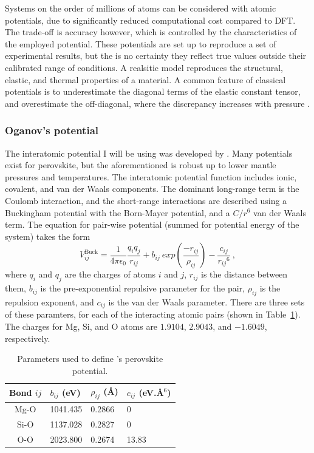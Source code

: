 Systems on the order of millions of atoms can be considered with atomic potentials, due to significantly reduced computational cost compared to DFT. The trade-off is accuracy however, which is controlled by the characteristics of the employed potential. These potentials are set up to reproduce a set of experimental results, but the is no certainty they reflect true values outside their calibrated range of conditions. A realsitic model reproduces the structural, elastic, and thermal properties of a material. A common feature of classical potentials is to underestimate the diagonal terms of the elastic constant tensor, and overestimate the off-diagonal, where the discrepancy increases with pressure \citep{Chen2012}.

\subsubsection{Oganov's \bdgs potential}

The interatomic potential I will be using  was developed by \citet{Oganov2000}. Many potentials exist for \mgsios perovskite, but the aforementioned is robust up to lower mantle pressures and temperatures. The interatomic potential function includes ionic, covalent, and van der Waals components. The dominant long-range term is the Coulomb interaction, and the short-range interactions are described using a Buckingham potential with the Born-Mayer potential, and a $C/r^{6}$ van der Waals term. The equation for pair-wise potential (summed for potential energy of the system) takes the form
%
\begin{equation}
V_{ij}^{\mathrm{Buck}}
= \frac{1}{4 \pi \epsilon_{0}} 
\frac{q_{i} q_{j}}{r_{ij}} 
+ b_{ij}\ exp\left ( \frac{-r_{ij}}{\rho_{ij}} \right )
- \frac{c_{ij}}{{r_{ij}}^{6}} \  ,
\label{eq.buck}
\end{equation}
%
where $q_{i}$ and $q_{j}$ are the charges of atoms $i$ and $j$, $r_{ij}$ is the distance between them, $b_{ij}$ is the pre-exponential repulsive parameter for the pair, $\rho_{ij}$ is the repulsion exponent, and $c_{ij}$ is the van der Waals parameter.
There are three sets of these paramters, for each of the interacting atomic pairs (shown in Table~\ref{tab.oganov}). The charges for Mg, Si, and O atoms are $1.9104$, $2.9043$, and $-1.6049$, respectively.
%
\begin{table}[h]
\centering
\caption[CONTENTS BIT]{\label{tab.oganov}Parameters used to define \citet{Oganov2000}'s \mgsios perovskite potential.}
\begin{tabular}{clll} 
Bond $ij$ & $b_{ij}$ (eV)  & $\rho_{ij}$ (\AA) & $c_{ij}$ (eV.\AA$^{6}$) \\ \hline
Mg-O        & 1041.435        & 0.2866                 & 0                \\
Si-O          & 1137.028        & 0.2827                 & 0                \\
O-O          & 2023.800        & 0.2674                  & 13.83         \\ \hline       
\end{tabular}
\end{table}



